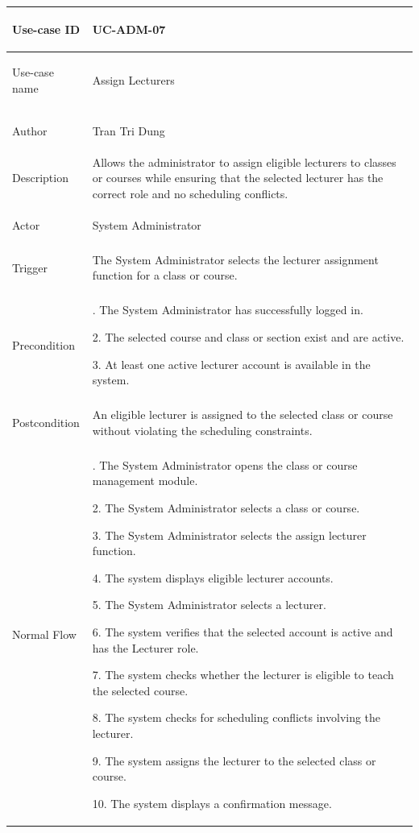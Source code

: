 \begin{longtable}{|>{\bfseries\raggedright\arraybackslash}p{}|>{\raggedright\arraybackslash}p{}|}
\hline
Use-case ID & UC-ADM-07 \\ \hline
Use-case name & Assign Lecturers \\ \hline
Author & Tran Tri Dung \\ \hline
Description & Allows the administrator to assign eligible lecturers to classes or courses while ensuring that the selected lecturer has the correct role and no scheduling conflicts. \\ \hline
Actor & System Administrator \\ \hline
Trigger & The System Administrator selects the lecturer assignment function for a class or course. \\ \hline
Precondition &
1. The System Administrator has successfully logged in. \par
2. The selected course and class or section exist and are active. \par
3. At least one active lecturer account is available in the system. \\ \hline
Postcondition & An eligible lecturer is assigned to the selected class or course without violating the scheduling constraints. \\ \hline
Normal Flow &
1. The System Administrator opens the class or course management module. \par
2. The System Administrator selects a class or course. \par
3. The System Administrator selects the assign lecturer function. \par
4. The system displays eligible lecturer accounts. \par
5. The System Administrator selects a lecturer. \par
6. The system verifies that the selected account is active and has the Lecturer role. \par
7. The system checks whether the lecturer is eligible to teach the selected course. \par
8. The system checks for scheduling conflicts involving the lecturer. \par
9. The system assigns the lecturer to the selected class or course. \par
10. The system displays a confirmation message. \\ \hline

\end{longtable}
